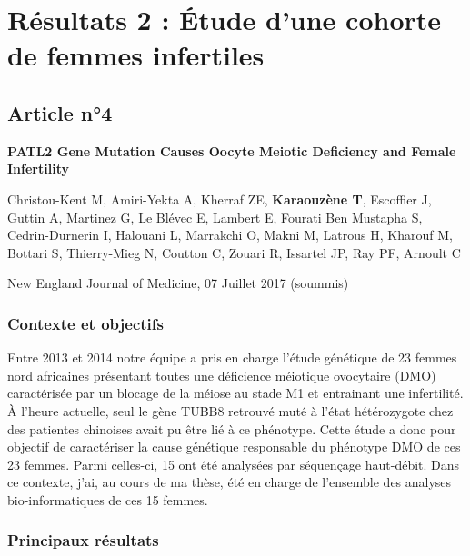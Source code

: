 \documentclass[12pt,a4paper,twoside]{ugathesis}
\theoremstyle{definition}
\theoremstyle{definition}
\theoremstyle{definition}
\theoremstyle{remark}
\begin{document}
\newpage

\section{Résultats 2 : Étude d'une cohorte de femmes
infertiles}\label{resultats-2-etude-dune-cohorte-de-femmes-infertiles}

\subsection{Article n°4}\label{article-n4}

\textbf{PATL2 Gene Mutation Causes Oocyte Meiotic Deficiency and Female
Infertility}

Christou-Kent M, Amiri-Yekta A, Kherraf ZE, \textbf{Karaouzène T},
Escoffier J, Guttin A, Martinez G, Le Blévec E, Lambert E, Fourati Ben
Mustapha S, Cedrin-Durnerin I, Halouani L, Marrakchi O, Makni M, Latrous
H, Kharouf M, Bottari S, Thierry-Mieg N, Coutton C, Zouari R, Issartel
JP, Ray PF, Arnoult C

New England Journal of Medicine, 07 Juillet 2017 (soummis)

\newpage

\subsubsection{Contexte et objectifs}\label{contexte-et-objectifs-3}

Entre 2013 et 2014 notre équipe a pris en charge l'étude génétique de 23
femmes nord africaines présentant toutes une déficience méiotique
ovocytaire (DMO) caractérisée par un blocage de la méiose au stade M1 et
entrainant une infertilité. À l'heure actuelle, seul le gène TUBB8
retrouvé muté à l'état hétérozygote chez des patientes chinoises avait
pu être lié à ce phénotype. Cette étude a donc pour objectif de
caractériser la cause génétique responsable du phénotype DMO de ces 23
femmes. Parmi celles-ci, 15 ont été analysées par séquençage haut-débit.
Dans ce contexte, j'ai, au cours de ma thèse, été en charge de
l'ensemble des analyses bio-informatiques de ces 15 femmes.

\newpage



\newpage

\subsubsection{Principaux résultats}\label{principaux-resultats-3}
\end{document}
